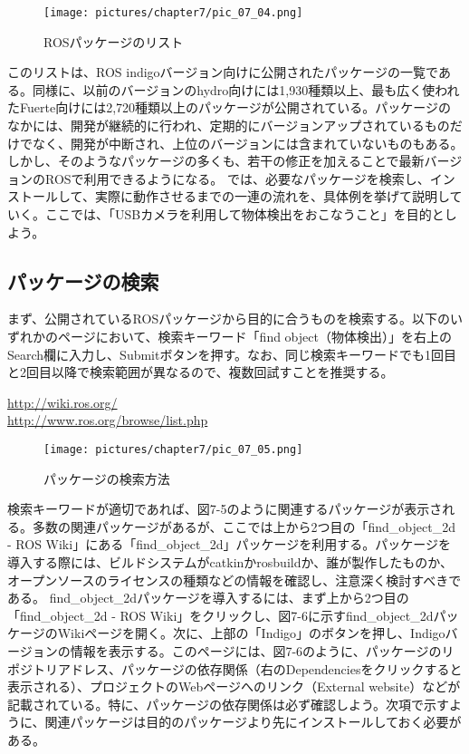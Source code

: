 \begin{figure}[htp]
  \centering
  \texttt{[image: pictures/chapter7/pic\_07\_04.png]}
  \caption{ROSパッケージのリスト}
\end{figure}


このリストは、ROS indigoバージョン向けに公開されたパッケージの一覧である。同様に、以前のバージョンのhydro向けには1,930種類以上、最も広く使われたFuerte向けには2,720種類以上のパッケージが公開されている。パッケージのなかには、開発が継続的に行われ、定期的にバージョンアップされているものだけでなく、開発が中断され、上位のバージョンには含まれていないものもある。しかし、そのようなパッケージの多くも、若干の修正を加えることで最新バージョンのROSで利用できるようになる。
では、必要なパッケージを検索し、インストールして、実際に動作させるまでの一連の流れを、具体例を挙げて説明していく。ここでは、「USBカメラを利用して物体検出をおこなうこと」を目的としよう。

\subsection{パッケージの検索}

まず、公開されているROSパッケージから目的に合うものを検索する。以下のいずれかのページにおいて、検索キーワード「find object（物体検出）」を右上のSearch欄に入力し、Submitボタンを押す。なお、同じ検索キーワードでも1回目と2回目以降で検索範囲が異なるので、複数回試すことを推奨する。

\vspace{\baselineskip}
\noindent\url{http://wiki.ros.org/}\\
\noindent\url{http://www.ros.org/browse/list.php}
\vspace{\baselineskip}

\begin{figure}[htp]
  \centering
  \texttt{[image: pictures/chapter7/pic\_07\_05.png]}
  \caption{パッケージの検索方法}
\end{figure}

検索キーワードが適切であれば、図7-5のように関連するパッケージが表示される。多数の関連パッケージがあるが、ここでは上から2つ目の「find\_object\_2d - ROS Wiki」にある「find\_object\_2d」パッケージを利用する。パッケージを導入する際には、ビルドシステムがcatkinかrosbuildか、誰が製作したものか、オープンソースのライセンスの種類などの情報を確認し、注意深く検討すべきである。
find\_object\_2dパッケージを導入するには、まず上から2つ目の「find\_object\_2d - ROS Wiki」をクリックし、図7-6に示すfind\_object\_2dパッケージのWikiページを開く。次に、上部の「Indigo」のボタンを押し、Indigoバージョンの情報を表示する。このページには、図7-6のように、パッケージのリポジトリアドレス、パッケージの依存関係（右のDependenciesをクリックすると表示される）、プロジェクトのWebページへのリンク（External website）などが記載されている。特に、パッケージの依存関係は必ず確認しよう。次項で示すように、関連パッケージは目的のパッケージより先にインストールしておく必要がある。

